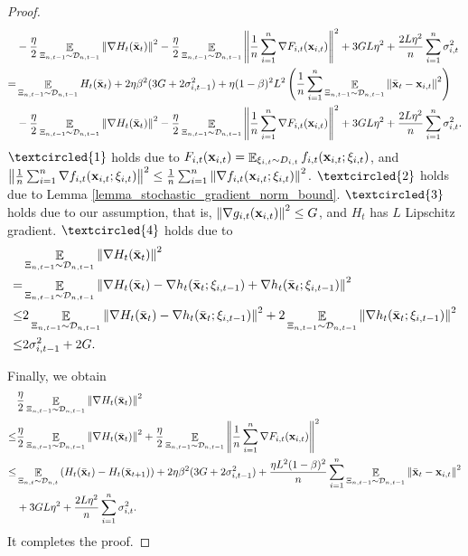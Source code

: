 \documentclass{article}
\begin{document}
\begin{proof}
\begin{align}
& - \frac{\eta}{2}\mathop{\mathbb{E}}_{ \Xi_{n,t-1} \sim \mathcal{D}_{n,t-1} }\left\lVert\nabla H_t(\bar{{\bf x}}_t)\right\rVert^2 - \frac{\eta}{2}\mathop{\mathbb{E}}_{ \Xi_{n,t-1} \sim \mathcal{D}_{n,t-1} }\left\lVert\frac{1}{n}\sum_{i=1}^n \nabla F_{i,t}({\bf x}_{i,t})\right\rVert^2  + 3GL\eta^2  + \frac{2L\eta^2}{n}\sum_{i=1}^n \sigma_{i,t}^2  \\ \nonumber
= & \mathop{\mathbb{E}}_{ \Xi_{n,t-1} \sim \mathcal{D}_{n,t-1} }H_t(\bar{{\bf x}}_t) + 2\eta\beta^2 (3G + 2\sigma_{i,t-1}^2) + \eta(1-\beta)^2 L^2\left( \frac{1}{n}\sum_{i=1}^n \mathop{\mathbb{E}}_{ \Xi_{n,t-1} \sim \mathcal{D}_{n,t-1} }\left\lVert\bar{{\bf x}}_t -{\bf x}_{i,t}\right\rVert^2 \right) \\ \nonumber 
& - \frac{\eta}{2}\mathop{\mathbb{E}}_{ \Xi_{n,t-1} \sim \mathcal{D}_{n,t-1} }\left\lVert\nabla H_t(\bar{{\bf x}}_t)\right\rVert^2 - \frac{\eta}{2}\mathop{\mathbb{E}}_{ \Xi_{n,t-1} \sim \mathcal{D}_{n,t-1} }\left\lVert\frac{1}{n}\sum_{i=1}^n \nabla F_{i,t}({\bf x}_{i,t})\right\rVert^2  +  3GL\eta^2  + \frac{2L\eta^2}{n}\sum_{i=1}^n \sigma_{i,t}^2.
\end{align} $\textcircled{1}$ holds due to $F_{i,t}({\bf x}_{i,t}) = \mathop{\mathbb{E}}_{\xi_{i,t} \sim D_{i,t}} f_{i,t}({\bf x}_{i,t}; \xi_{i,t})$, and $\left\lVert\frac{1}{n}\sum_{i=1}^n \nabla f_{i,t}({\bf x}_{i,t};\xi_{i,t})\right\rVert^2 \le \frac{1}{n}\sum_{i=1}^n\left\lVert\nabla f_{i,t}({\bf x}_{i,t};\xi_{i,t})\right\rVert^2$. $\textcircled{2}$ holds due to Lemma \ref{lemma_stochastic_gradient_norm_bound}. $\textcircled{3}$ holds due to our assumption, that is, $\left\lVert\nabla g_{i,t}({\bf x}_{i,t})\right\rVert^2\le G$, and $H_t$ has $L$ Lipschitz gradient. $\textcircled{4}$ holds due to 
\begin{align}
\nonumber
& \mathop{\mathbb{E}}_{ \Xi_{n,t-1} \sim \mathcal{D}_{n,t-1} }\left\lVert\nabla H_t(\bar{{\bf x}}_t) \right\rVert^2 \\ \nonumber 
= & \mathop{\mathbb{E}}_{ \Xi_{n,t-1} \sim \mathcal{D}_{n,t-1} } \left\lVert\nabla H_t(\bar{{\bf x}}_t) - \nabla h_t(\bar{{\bf x}}_t; \xi_{i,t-1}) + \nabla h_t(\bar{{\bf x}}_t; \xi_{i,t-1}) \right\rVert^2 \\ \nonumber
\le & 2\mathop{\mathbb{E}}_{ \Xi_{n,t-1} \sim \mathcal{D}_{n,t-1} } \left\lVert\nabla H_t(\bar{{\bf x}}_t) - \nabla h_t(\bar{{\bf x}}_t; \xi_{i,t-1}) \right\rVert^2 + 2\mathop{\mathbb{E}}_{ \Xi_{n,t-1} \sim \mathcal{D}_{n,t-1} } \left\lVert\nabla h_t(\bar{{\bf x}}_t; \xi_{i,t-1}) \right\rVert^2 \\ \nonumber
\le & 2\sigma_{i,t-1}^2 + 2G.
\end{align}




Finally, we obtain
\begin{align}
\nonumber
& \frac{\eta}{2}\mathop{\mathbb{E}}_{ \Xi_{n,t-1} \sim \mathcal{D}_{n,t-1} }\left\lVert\nabla H_t(\bar{{\bf x}}_t)\right\rVert^2  \\ \nonumber
\le & \frac{\eta}{2}\mathop{\mathbb{E}}_{ \Xi_{n,t-1} \sim \mathcal{D}_{n,t-1} }\left\lVert\nabla H_t(\bar{{\bf x}}_t)\right\rVert^2 + \frac{\eta}{2}\mathop{\mathbb{E}}_{ \Xi_{n,t-1} \sim \mathcal{D}_{n,t-1} }\left\lVert\frac{1}{n}\sum_{i=1}^n \nabla F_{i,t}({\bf x}_{i,t})\right\rVert^2 \\ \nonumber 
\le & \mathop{\mathbb{E}}_{ \Xi_{n,t} \sim \mathcal{D}_{n,t} } \left( H_t(\bar{{\bf x}}_t) - H_t(\bar{{\bf x}}_{t+1}) \right) + 2\eta\beta^2(3G + 2\sigma_{i,t-1}^2) +  \frac{\eta L^2(1-\beta)^2}{n}\sum_{i=1}^n\mathop{\mathbb{E}}_{ \Xi_{n,t-1} \sim \mathcal{D}_{n,t-1} }\left\lVert\bar{{\bf x}}_t - {\bf x}_{i,t} \right\rVert^2 \\ \nonumber 
& + 3GL\eta^2  + \frac{2L\eta^2}{n}\sum_{i=1}^n \sigma_{i,t}^2.
\end{align} It completes the proof.
\end{proof}
\end{document}
